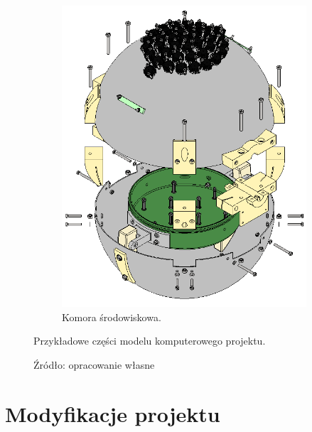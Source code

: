 \begin{figure}[]
\begin{subfigure}[b]{.49\textwidth}
		\label{fig:czwórnik}
	\end{subfigure}\vspace{15mm}%
	
	\begin{subfigure}{.8\textwidth}
		\centering
		\includegraphics[scale=0.3]{Komora_tweaked_colors_exploded}
		\caption{Komora środowiskowa.} 
		\label{fig:komora}
	\end{subfigure}
	
	\caption{Przykładowe części modelu komputerowego projektu.}
	\caption*{Źródło: opracowanie własne}
	
\end{figure}


\section{Modyfikacje projektu}

